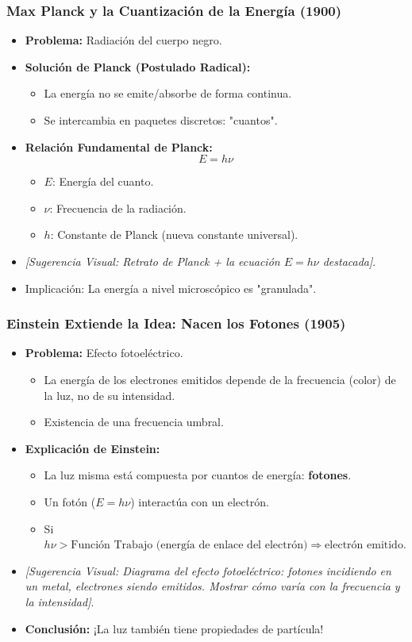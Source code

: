 \documentclass{beamer}
\begin{document}
	\begin{frame}
		\frametitle{Max Planck y la Cuantización de la Energía (1900)}
		\begin{itemize}
			\item \textbf{Problema:} Radiación del cuerpo negro. \pause
			\item \textbf{Solución de Planck (Postulado Radical):}
			\begin{itemize}
				\item La energía no se emite/absorbe de forma continua.
				\item Se intercambia en paquetes discretos: "cuantos".
			\end{itemize} \pause
			\item \textbf{Relación Fundamental de Planck:}
			\[ E = h\nu \]
			\begin{itemize}
				\item $E$: Energía del cuanto.
				\item $\nu$: Frecuencia de la radiación.
				\item $h$: Constante de Planck (nueva constante universal).
			\end{itemize} \pause
			\item \textit{[Sugerencia Visual: Retrato de Planck + la ecuación $E = h\nu$ destacada]}. \pause
			\item Implicación: La energía a nivel microscópico es "granulada".
		\end{itemize}
	\end{frame}
	
	\begin{frame}
		\frametitle{Einstein Extiende la Idea: Nacen los Fotones (1905)}
		\begin{itemize}
			\item \textbf{Problema:} Efecto fotoeléctrico.
			\begin{itemize}
				\item La energía de los electrones emitidos depende de la frecuencia (color) de la luz, no de su intensidad.
				\item Existencia de una frecuencia umbral.
			\end{itemize} \pause
			\item \textbf{Explicación de Einstein:}
			\begin{itemize}
				\item La luz misma está compuesta por cuantos de energía: \textbf{fotones}.
				\item Un fotón ($E=h\nu$) interactúa con un electrón.
				\item Si $h\nu > \text{Función Trabajo (energía de enlace del electrón)} \Rightarrow \text{electrón emitido}$.
			\end{itemize} \pause
			\item \textit{[Sugerencia Visual: Diagrama del efecto fotoeléctrico: fotones incidiendo en un metal, electrones siendo emitidos. Mostrar cómo varía con la frecuencia y la intensidad]}. \pause
			\item \textbf{Conclusión:} ¡La luz también tiene propiedades de partícula!
		\end{itemize}
	\end{frame}
	
\end{document}
